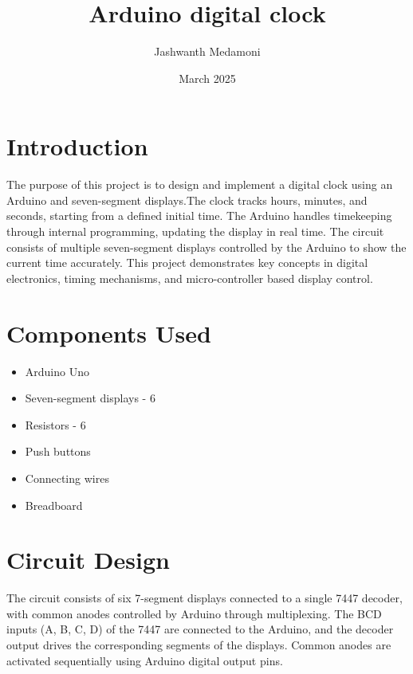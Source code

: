 \documentclass{article}
\theoremstyle{remark}
\begin{document}

\vspace{3cm}

\title{Arduino digital clock}
\author{Jashwanth Medamoni}
\date{March 2025}


\maketitle

\section{Introduction}
The purpose of this project is to design and implement a digital clock using an Arduino and seven-segment displays.The clock tracks hours, minutes, and seconds, starting from a defined initial time. The Arduino handles timekeeping through internal programming, updating the display in real time. The circuit consists of multiple seven-segment displays controlled by the Arduino to show the current time accurately. This project demonstrates key concepts in digital electronics, timing mechanisms, and micro-controller based display control.

\section{Components Used}

\begin{itemize}
    \item Arduino Uno
    \item Seven-segment displays - 6
    \item Resistors - 6
    \item Push buttons 
    \item Connecting wires
    \item Breadboard
\end{itemize}

\section{Circuit Design}
The circuit consists of six 7-segment displays connected to a single 7447 decoder, with common anodes controlled by Arduino through multiplexing. The BCD inputs (A, B, C, D) of the 7447 are connected to the Arduino, and the decoder output drives the corresponding segments of the displays. Common anodes are activated sequentially using Arduino digital output pins.\\
\end{document}
